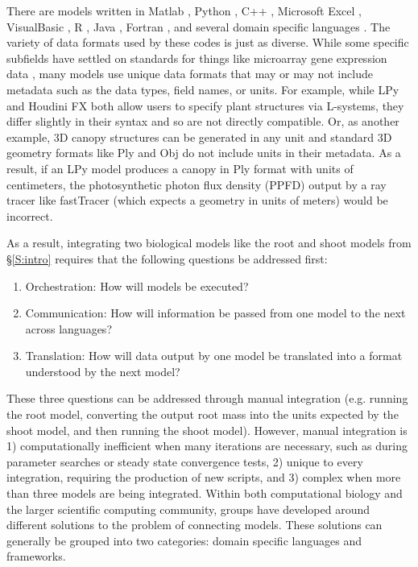 \documentclass[journal]{IEEEtran}
\begin{document}
There are models written in Matlab \citep{ZHU2013, Wang2014}, Python \citep{Pradal2009}, C++ \citep{Merks2011, Postma2017}, Microsoft Excel \citep{Sharkey2016}, VisualBasic \citep{Humphries1995, HALL2013}, R \citep{WANG2015}, Java \citep{Song2013, Kappas2013}, Fortran \citep{Goudriaan1994}, and several domain specific languages \citep[e.g. SBML,][]{Hucka2003}. The variety of data formats used by these codes is just as diverse. While some specific subfields have settled on standards for things like microarray gene expression data \citep[e.g. MINiML,][]{GEO2017}, many models use unique data formats that may or may not include metadata such as the data types, field names, or units. 
For example, while LPy \citep{Boudon2012} and Houdini FX \citep{HoudiniFX} both allow users to specify plant structures via L-systems, they differ slightly in their syntax and so are not directly compatible. Or, as another example, 3D canopy structures can be generated in any unit and standard 3D geometry formats like Ply \citep{ply} and Obj \citep{obj} do not include units in their metadata. As a result, if an LPy model produces a canopy in Ply format with units of centimeters, the photosynthetic photon flux density (PPFD) output by a ray tracer like fastTracer \citep{Song2013} (which expects a geometry in units of meters) would be incorrect. 

As a result, integrating two biological models like the root and shoot models from \S\ref{S:intro} requires that the following questions be addressed first:
%
\begin{enumerate}
	\item Orchestration: How will models be executed?
	\item Communication: How will information be passed from one model to the next across languages?
	\item Translation: How will data output by one model be translated into a format understood by the next model?
\end{enumerate}

These three questions can be addressed through manual integration (e.g. running the root model, converting the output root mass into the units expected by the shoot model, and then running the shoot model). However, manual integration is 1) computationally inefficient when many iterations are necessary, such as during parameter searches or steady state convergence tests, 2) unique to every integration, requiring the production of new scripts, and 3) complex when more than three models are being integrated. Within both computational biology and the larger scientific computing community, groups have developed around different solutions to the problem of connecting models. These solutions can generally be grouped into two categories: domain specific languages and frameworks.
\end{document}
